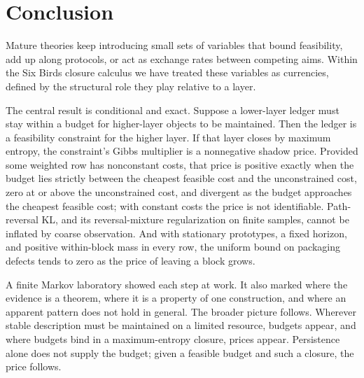 \section{Conclusion}\label{sec:conclusion}

Mature theories keep introducing small sets of variables that bound feasibility, add up along protocols, or act as exchange rates between competing aims. Within the Six Birds closure calculus we have treated these variables as currencies, defined by the structural role they play relative to a layer.

The central result is conditional and exact. Suppose a lower-layer ledger must stay within a budget for higher-layer objects to be maintained. Then the ledger is a feasibility constraint for the higher layer. If that layer closes by maximum entropy, the constraint's Gibbs multiplier is a nonnegative shadow price. Provided some weighted row has nonconstant costs, that price is positive exactly when the budget lies strictly between the cheapest feasible cost and the unconstrained cost, zero at or above the unconstrained cost, and divergent as the budget approaches the cheapest feasible cost; with constant costs the price is not identifiable. Path-reversal KL, and its reversal-mixture regularization on finite samples, cannot be inflated by coarse observation. And with stationary prototypes, a fixed horizon, and positive within-block mass in every row, the uniform bound on packaging defects tends to zero as the price of leaving a block grows.

A finite Markov laboratory showed each step at work. It also marked where the evidence is a theorem, where it is a property of one construction, and where an apparent pattern does not hold in general. The broader picture follows. Wherever stable description must be maintained on a limited resource, budgets appear, and where budgets bind in a maximum-entropy closure, prices appear. Persistence alone does not supply the budget; given a feasible budget and such a closure, the price follows.
